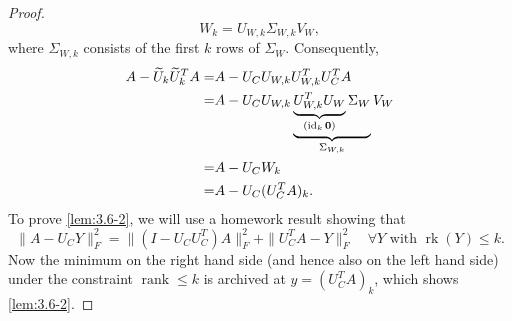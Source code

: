 \begin{theorem}
\begin{lemma}
\begin{proof}
\begin{equation}
W_k = U_{W,k} \Sigma_{W,k} V_{W},
\end{equation}
where $\Sigma_{W,k}$ consists of the first $k$ rows of $\Sigma_W$. Consequently,
\begin{equation}
\begin{split}
A-\widetilde{U}_k\widetilde{U}_k^TA = & A-U_CU_{W,k}U_{W,k}^TU_C^TA \\
= & A- U_C U_{W,k} \underbrace{\underbrace{U_{W,k}^T U_W}_{(\operatorname{id}_k \mathbf{0})}\Sigma_W}_{
\Sigma_{W,k}
}V_W \\
= & A-U_CW_k \\
= & A-U_C (U_C^TA)_k.
\end{split}
\end{equation}
To prove \eqref{lem:3.6-2}, we will use a homework result showing that 
\begin{equation}
\|A-U_CY\|_F^2 = \|(I-U_CU_C^T)A\|_F^2 + \|U_C^TA-Y\|_F^2	\quad \forall Y\text{ with }\operatorname{rk}(Y)\leq k.
\end{equation}
Now the minimum on the right hand side (and hence also on the left hand side) under the constraint $\operatorname{rank} \leq k$ is archived at $y=(U_C^TA)_k$, which shows \eqref{lem:3.6-2}.
\end{proof}
\end{lemma}
\end{theorem}

